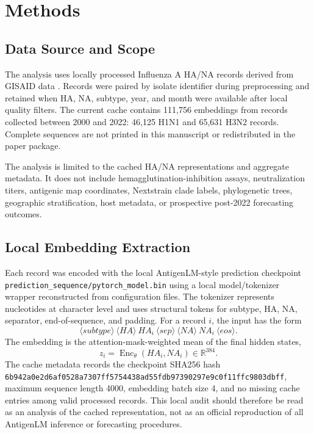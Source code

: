 \documentclass[11pt]{article}
\newcommand{\Enc}{\operatorname{Enc}}
\newcommand{\R}{\mathbb{R}}
\begin{document}
\section{Methods}

\subsection{Data Source and Scope}

The analysis uses locally processed Influenza A HA/NA records derived from GISAID data \cite{shu2017gisaid}. Records were paired by isolate identifier during preprocessing and retained when HA, NA, subtype, year, and month were available after local quality filters. The current cache contains 111,756 embeddings from records collected between 2000 and 2022: 46,125 H1N1 and 65,631 H3N2 records. Complete sequences are not printed in this manuscript or redistributed in the paper package.

The analysis is limited to the cached HA/NA representations and aggregate metadata. It does not include hemagglutination-inhibition assays, neutralization titers, antigenic map coordinates, Nextstrain clade labels, phylogenetic trees, geographic stratification, host metadata, or prospective post-2022 forecasting outcomes.

\subsection{Local Embedding Extraction}

Each record was encoded with the local AntigenLM-style prediction checkpoint \texttt{prediction\_sequence/pytorch\_model.bin} using a local model/tokenizer wrapper reconstructed from configuration files. The tokenizer represents nucleotides at character level and uses structural tokens for subtype, HA, NA, separator, end-of-sequence, and padding. For a record $i$, the input has the form
\[
\langle subtype\rangle \ \langle HA\rangle \ HA_i \ \langle sep\rangle \ \langle NA\rangle \ NA_i \ \langle eos\rangle .
\]
The embedding is the attention-mask-weighted mean of the final hidden states,
\[
z_i=\Enc_{\theta}(HA_i,NA_i)\in\R^{384}.
\]
The cache metadata records the checkpoint SHA256 hash
\texttt{6b942a0e2d6af0528a7307ff5754438ad55fdb97390297e9c0f11ffc9803dbff}, maximum sequence length 4000, embedding batch size 4, and no missing cache entries among valid processed records. This local audit should therefore be read as an analysis of the cached representation, not as an official reproduction of all AntigenLM inference or forecasting procedures.
\end{document}
